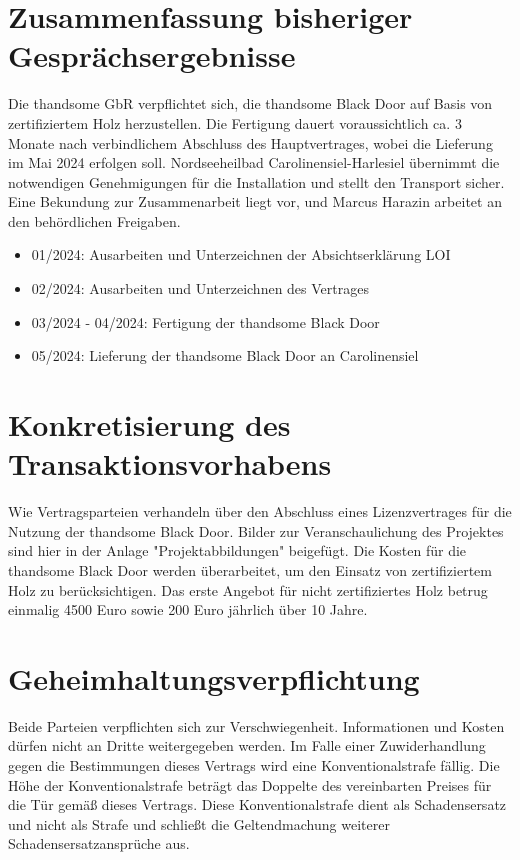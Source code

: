 \section[Gesprächsergebnisse]{Zusammenfassung bisheriger Gesprächsergebnisse}

Die thandsome GbR verpflichtet sich, die thandsome Black Door auf Basis von zertifiziertem Holz herzustellen. 
Die Fertigung dauert voraussichtlich ca. 3 Monate nach verbindlichem Abschluss des Hauptvertrages, wobei die Lieferung 
im Mai 2024 erfolgen soll. Nordseeheilbad Carolinensiel-Harlesiel übernimmt die notwendigen 
Genehmigungen für die Installation und stellt den Transport sicher. Eine Bekundung zur Zusammenarbeit liegt vor, und Marcus Harazin 
arbeitet an den behördlichen Freigaben. 


\begin{itemize}
    \item 01/2024: Ausarbeiten und Unterzeichnen der Absichtserklärung \- LOI
    \item 02/2024: Ausarbeiten und Unterzeichnen des Vertrages 
    \item 03/2024 - 04/2024: Fertigung der thandsome Black Door 
    \item 05/2024: Lieferung der thandsome Black Door an Carolinensiel 
    \end{itemize}
    


\section[Konkretisierung]{Konkretisierung des Transaktionsvorhabens}

Wie Vertragsparteien verhandeln über den Abschluss eines Lizenzvertrages für die Nutzung der thandsome Black Door.
Bilder zur Veranschaulichung des Projektes sind hier in der Anlage "Projektabbildungen" beigefügt. 
Die Kosten für die thandsome Black Door werden überarbeitet, um den Einsatz von zertifiziertem
Holz zu berücksichtigen. Das erste Angebot für nicht zertifiziertes Holz betrug einmalig
4500 Euro sowie 200 Euro jährlich über 10 Jahre. 


\section[Geheimhaltungsverpflichtungt]{Geheimhaltungsverpflichtung}

Beide Parteien verpflichten sich zur Verschwiegenheit. 
Informationen und Kosten dürfen nicht an Dritte weitergegeben werden.
Im Falle einer Zuwiderhandlung gegen die Bestimmungen dieses Vertrags wird eine Konventionalstrafe fällig. 
Die Höhe der Konventionalstrafe beträgt das Doppelte des vereinbarten Preises für die Tür gemäß dieses Vertrags. 
Diese Konventionalstrafe dient als Schadensersatz und nicht als Strafe und schließt die Geltendmachung weiterer 
Schadensersatzansprüche aus.

